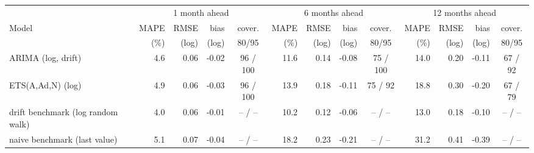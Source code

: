 \begin{tabular}{lrrrcrrrcrrrc}
\toprule
 & \multicolumn{4}{c}{1 month ahead} & \multicolumn{4}{c}{6 months ahead} & \multicolumn{4}{c}{12 months ahead} \\
Model & MAPE & RMSE & bias & cover. & MAPE & RMSE & bias & cover. & MAPE & RMSE & bias & cover. \\
 & (\%) & (log) & (log) & 80/95 & (\%) & (log) & (log) & 80/95 & (\%) & (log) & (log) & 80/95 \\
\midrule
ARIMA (log, drift) & 4.6 & 0.06 & -0.02 & 96 / 100 & 11.6 & 0.14 & -0.08 & 75 / 100 & 14.0 & 0.20 & -0.11 & 67 / 92 \\
ETS(A,Ad,N) (log) & 4.9 & 0.06 & -0.03 & 96 / 100 & 13.9 & 0.18 & -0.11 & 75 / 92 & 18.8 & 0.30 & -0.20 & 67 / 79 \\
drift benchmark (log random walk) & 4.0 & 0.06 & -0.01 & -- / -- & 10.2 & 0.12 & -0.06 & -- / -- & 13.0 & 0.18 & -0.10 & -- / -- \\
naive benchmark (last value) & 5.1 & 0.07 & -0.04 & -- / -- & 18.2 & 0.23 & -0.21 & -- / -- & 31.2 & 0.41 & -0.39 & -- / -- \\
\bottomrule
\end{tabular}